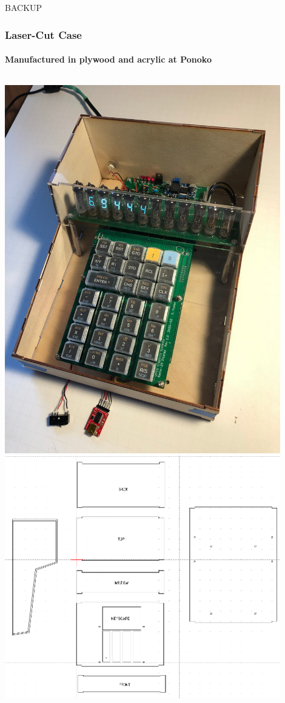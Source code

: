 \documentclass{beamer}
\begin{document}
\begin{frame}
        BACKUP
\end{frame}

\begin{frame}
  \frametitle{Laser-Cut Case}
  \framesubtitle{Manufactured in plywood and acrylic at Ponoko}
  \vskip -0.2in
  \begin{columns}
    \includegraphics[width=0.9\textwidth]{figs/case-800.jpg}
    \includegraphics[width=0.9\textwidth]{figs/case-parts.png} \\

\end{columns}
\end{frame}
\end{document}
